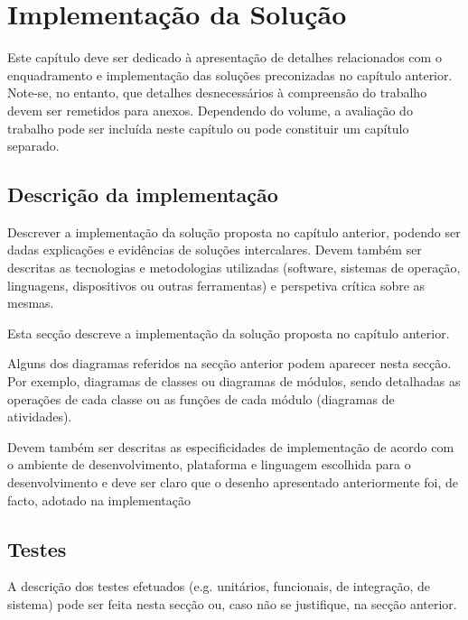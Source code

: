 \chapter{Implementação da Solução} 
\label{cap:implementação}

Este capítulo deve ser dedicado à apresentação de detalhes relacionados com o enquadramento e implementação das soluções preconizadas no capítulo anterior. Note-se, no entanto, que detalhes desnecessários à compreensão do trabalho devem ser remetidos para anexos. Dependendo do volume, a avaliação do trabalho pode ser incluída neste capítulo ou pode constituir um capítulo separado.



\section{Descrição da implementação} 
\label{sec:descrição_implementação}

Descrever a implementação da solução proposta no capítulo anterior, podendo ser dadas explicações e evidências de soluções intercalares. Devem também ser descritas as tecnologias e metodologias utilizadas (software, sistemas de operação, linguagens, dispositivos ou outras ferramentas) e perspetiva crítica sobre as mesmas. 

Esta secção descreve a implementação da solução proposta no capítulo anterior. 

Alguns dos diagramas referidos na secção anterior podem aparecer nesta secção. Por exemplo, diagramas de classes ou diagramas de módulos, sendo detalhadas as operações de cada classe ou as funções de cada módulo (diagramas de atividades). 

Devem também ser descritas as especificidades de implementação de acordo com o ambiente de desenvolvimento, plataforma e linguagem escolhida para o desenvolvimento e deve ser claro que o desenho apresentado anteriormente foi, de facto, adotado na implementação



\section{Testes} 

A descrição dos testes efetuados (e.g. unitários, funcionais, de integração, de sistema) pode ser feita nesta secção ou, caso não se justifique, na secção anterior.


